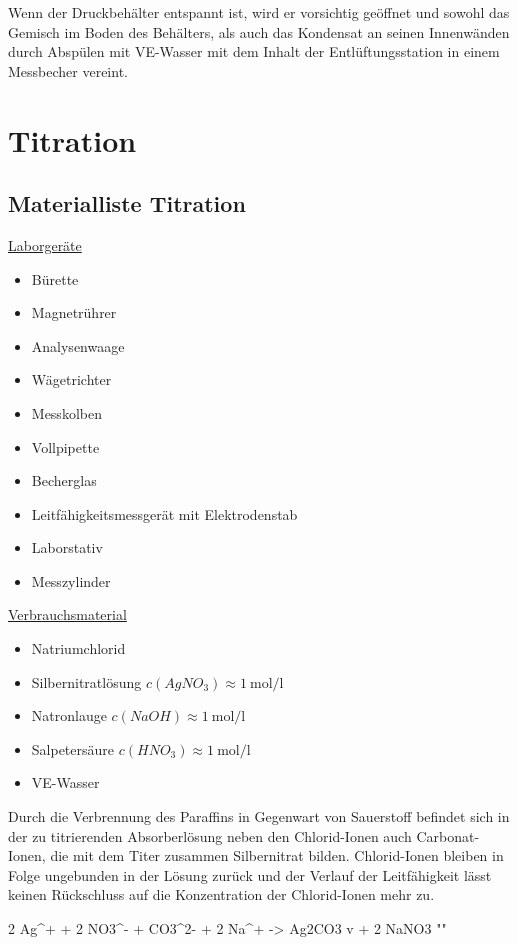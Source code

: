 		Wenn der Druckbehälter entspannt ist, wird er vorsichtig geöffnet und sowohl das Gemisch im Boden des Behälters, als auch das Kondensat an
		seinen Innenwänden durch Abspülen mit VE-Wasser mit dem Inhalt der Entlüftungsstation in einem Messbecher vereint.
	\section{Titration}\label{sec:titration}
		\subsection*{Materialliste Titration}
			\underline{Laborgeräte}
			\begin{itemize}
				\item Bürette
				\item Magnetrührer
				\item Analysenwaage
				\item Wägetrichter
				\item Messkolben
				\item Vollpipette
				\item Becherglas
				\item Leitfähigkeitsmessgerät mit Elektrodenstab
				\item Laborstativ
				\item Messzylinder
			\end{itemize}

			\underline{Verbrauchsmaterial}
			\begin{itemize}
				\item Natriumchlorid
				\item Silbernitratlösung \(c(AgNO_3) \approx \SI{1}{\mole\per\litre}\)
				\item Natronlauge \(c(NaOH) \approx \SI{1}{\mole\per\litre}\)
				\item Salpetersäure \(c(HNO_3) \approx \SI{1}{\mole\per\litre}\)
				\item VE-Wasser
			\end{itemize}
		Durch die Verbrennung des Paraffins in Gegenwart von Sauerstoff befindet sich in der zu titrierenden Absorberlösung neben den Chlorid-Ionen
		auch Carbonat-Ionen, die mit dem Titer zusammen Silbernitrat bilden. Chlorid-Ionen bleiben in Folge ungebunden in der Lösung zurück
		und der Verlauf der Leitfähigkeit lässt keinen Rückschluss auf die Konzentration der Chlorid-Ionen mehr zu.
		\begin{reaction}
			2 Ag^+ + 2 NO3^- + CO3^{2-} + 2 Na^+ -> Ag2CO3 v + 2 NaNO3 "\label{re:silbercarbonat bildung}"
		\end{reaction}


